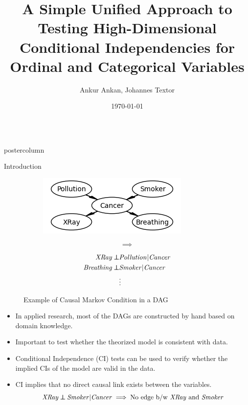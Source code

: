 \documentclass{beamer}
\title{\huge A Simple Unified Approach to Testing High-Dimensional Conditional Independencies for Ordinal and Categorical Variables}
\author{Ankur Ankan, Johannes Textor}
\institute[RU]{Institute for Computing and Information Sciences \\ Radboud University, Netherlands}
\date{\today}
\def\ci{\perp\!\!\!\!\!\perp}
\newlength{\columnheight}
\begin{document}
\begin{frame}
\begin{columns}
	\begin{column}{.33\textwidth}
		\begin{beamercolorbox}[center]{postercolumn}
			\begin{minipage}{.98\textwidth}  %
				\parbox[t][\columnheight]{\textwidth}{ %
					\begin{myblock}{Introduction}
						\begin{figure}
							\begin{subfigure}{0.46\textwidth}
								\centering
								\includegraphics[scale=1.5]{../in_person/imgs/example_dag.png}
							\end{subfigure}%
							\begin{subfigure}{0.08\textwidth}
								$$ \bm{\implies} $$
							\end{subfigure}%
							\begin{subfigure}{0.46\textwidth}
								\begin{equation*}
									\begin{split}
										\text{\emph{XRay}} \ci & \text{\emph{Pollution}} | \text{\emph{Cancer}} \\
										\text{\emph{Breathing}} \ci & \text{\emph{Smoker}} | \text{\emph{Cancer}} \\
										& \vdots \\
									\end{split}
								\end{equation*}
							\end{subfigure}
							\caption*{Example of Causal Markov Condition in a DAG \footnotemark}
						\end{figure}

	\begin{itemize}
		\item In applied research, most of the DAGs are constructed by hand
			based on domain knowledge.
		\item Important to test whether the theorized model is consistent with data.
		\item Conditional Independence (CI) tests can be used to verify whether the implied
			CIs of the model are valid in the data.
		\item CI implies that no direct causal link exists between the variables.
			$$ \text{\emph{XRay}} \ci \text{\emph{Smoker}} | \text{\emph{Cancer}} \implies \text{No edge b/w \emph{XRay} and \emph{Smoker}} $$


\end{itemize}
\end{myblock}}
\end{minipage}
\end{beamercolorbox}
\end{column}
\end{columns}
\end{frame}
\end{document}
